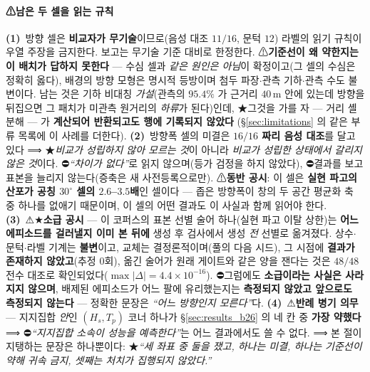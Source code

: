 \documentclass[11pt]{report}
\numberwithin{equation}{chapter}
\numberwithin{figure}{chapter}
\numberwithin{table}{chapter}
\begin{document}
\paragraph{⚠남은 두 셀을 읽는 규칙}
\textbf{(1)}~방향 셀은 \textbf{비교자가 무기술}이므로(음성 대조 $11/16$, 문턱 $12$) 라벨의
읽기 규칙이 우열 주장을 금지한다. 보고는 무기술 기준 대비로 한정한다. ⚠\textbf{기준선이 왜
약한지는 이 배치가 답하지 못한다} --- 수심 셀과 \emph{같은 원인은 아님}이 확정이고(그 셀의
수심은 정확히 옳다), 배경의 방향 모형은 명시적 등방이며 첨두 파장$\cdot$관측 기하$\cdot$관측
수도 불변이다. 남는 것은 기하 비대칭 \emph{가설}(관측의 $95.4\%$ 가 근거리 $40$\,m 안에
있는데 방향을 뒤집으면 그 패치가 미관측 원거리의 \emph{하류}가 된다)인데, ★그것을 가를 자
--- 거리 셸 분해 --- 가 \textbf{계산되어 반환되고도 행에 기록되지 않았다}
(\S\ref{sec:limitations} 의 같은 부류 목록에 이 사례를 더한다).
\textbf{(2)}~방향폭 셀의 미결은 \textbf{$16/16$ 짜리 음성 대조}를 달고 있다 ⟹ ★\emph{비교가
성립하지 않아 모르는 것}이 아니라 \emph{비교가 성립한 상태에서 갈리지 않은 것}이다.
⛔\emph{``차이가 없다''}로 읽지 않으며(등가 검정을 하지 않았다), ⛔결과를 보고 표본을 늘리지
않는다(증축은 새 사전등록으로만). ⚠\textbf{동반 공시}: 이 셀은 \textbf{실현 파고의 산포가
공칭 $30^\circ$ 셀의 $2.6$--$3.5$배}인 셀이다 --- 좁은 방향폭이 창의 두 공간 평균화 축 중
하나를 없애기 때문이며, 이 셀의 어떤 결과도 이 사실과 함께 읽어야 한다.
\textbf{(3)}~⚠★\textbf{소급 공시} --- 이 코퍼스의 표본 선별 술어 하나(실현 파고 이탈 상한)는
\textbf{어느 에피소드를 걸러낼지 이미 본 뒤에} 생성 후 검사에서 생성 \emph{전} 선별로
옮겨졌다. 상수$\cdot$문턱$\cdot$라벨 기계는 \textbf{불변}이고, 교체는 결정론적이며(풀의 다음
시드), 그 시점에 \textbf{결과가 존재하지 않았고}(추정 $0$회), 옮긴 술어가 원래 게이트와
같은 양을 잰다는 것은 $48/48$ 전수 대조로 확인되었다($\max|\Delta| = 4.4\times10^{-16}$).
⛔그럼에도 \textbf{소급이라는 사실은 사라지지 않으며}, 배제된 에피소드가 어느 팔에 유리했는지는
\textbf{측정되지 않았고 앞으로도 측정되지 않는다} --- 정확한 문장은 \emph{``어느 방향인지
모른다''}다.
\textbf{(4)}~⚠\textbf{반례 병기 의무} --- 지지집합 \emph{안}인 $(H_s, T_p)$ 코너 하나가
\S\ref{sec:results_b26} 의 네 칸 중 \textbf{가장 약했다} ⟹ ⛔\emph{``지지집합 소속이 성능을
예측한다''}는 어느 결과에서도 쓸 수 없다. ⟹ 본 절이 지탱하는 문장은 하나뿐이다:
★\emph{``세 좌표 중 둘을 쟀고, 하나는 미결, 하나는 기준선이 약해 귀속 금지, 셋째는 처치가
집행되지 않았다.''}
\end{document}

